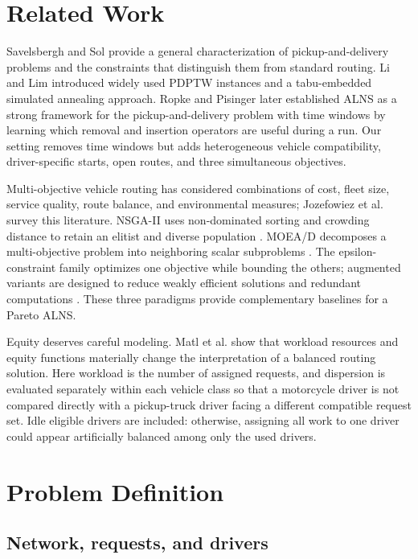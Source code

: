 \documentclass[11pt,a4paper]{article}
\begin{document}
\section{Related Work}

Savelsbergh and Sol \cite{savelsbergh1995general} provide a general characterization of pickup-and-delivery problems and the constraints that distinguish them from standard routing. Li and Lim \cite{li2003metaheuristic} introduced widely used PDPTW instances and a tabu-embedded simulated annealing approach. Ropke and Pisinger \cite{ropke2006alns} later established ALNS as a strong framework for the pickup-and-delivery problem with time windows by learning which removal and insertion operators are useful during a run. Our setting removes time windows but adds heterogeneous vehicle compatibility, driver-specific starts, open routes, and three simultaneous objectives.

Multi-objective vehicle routing has considered combinations of cost, fleet size, service quality, route balance, and environmental measures; Jozefowiez et al. \cite{jozefowiez2008multi} survey this literature. NSGA-II uses non-dominated sorting and crowding distance to retain an elitist and diverse population \cite{deb2002nsga2}. MOEA/D decomposes a multi-objective problem into neighboring scalar subproblems \cite{zhang2007moead}. The epsilon-constraint family optimizes one objective while bounding the others; augmented variants are designed to reduce weakly efficient solutions and redundant computations \cite{mavrotas2009epsilon}. These three paradigms provide complementary baselines for a Pareto ALNS.

Equity deserves careful modeling. Matl et al. \cite{matl2018equity} show that workload resources and equity functions materially change the interpretation of a balanced routing solution. Here workload is the number of assigned requests, and dispersion is evaluated separately within each vehicle class so that a motorcycle driver is not compared directly with a pickup-truck driver facing a different compatible request set. Idle eligible drivers are included: otherwise, assigning all work to one driver could appear artificially balanced among only the used drivers.

\section{Problem Definition}

\subsection{Network, requests, and drivers}
\end{document}
